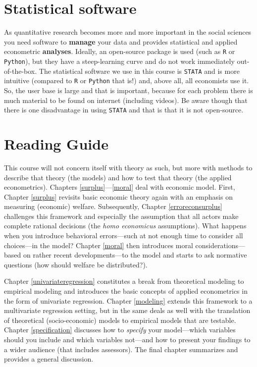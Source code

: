 \documentclass[
]{book}
\begin{document}
\hypertarget{statistical-software}{%
\section{Statistical software}\label{statistical-software}}

As quantitative research becomes more and more important in the social sciences you need software to \textbf{manage} your data and provides statistical and applied econometric \textbf{analyses}. Ideally, an open-source package is used (such as \texttt{R} or \texttt{Python}), but they have a steep-learning curve and do not work immediately out-of-the-box. The statistical software we use in this course is \texttt{STATA} and is more intuitive (compared to \texttt{R} or \texttt{Python} that is!) and, above all, all economists use it. So, the user base is large and that is important, because for each problem there is much material to be found on internet (including videos). Be aware though that there is one disadvantage in using \texttt{STATA} and that is that it is not open-source.

\hypertarget{reading-guide}{%
\section{Reading Guide}\label{reading-guide}}

This course will not concern itself with theory as such, but more with methods to describe that theory (the models) and how to test that theory (the applied econometrics). Chapters \ref{surplus}---\ref{moral} deal with economic model. First, Chapter \ref{surplus} revisits basic economic theory again with an emphasis on measuring (economic) welfare. Subsequently, Chapter \ref{erroreconsurplus} challenges this framework and especially the assumption that all actors make complete rational decisions (the \emph{homo economicus} assumptions). What happens when you introduce behavioral errors---such at not enough time to consider all choices---in the model? Chapter \ref{moral} then introduces moral considerations---based on rather recent developments---to the model and starts to ask normative questions (how should welfare be distributed?).

Chapter \ref{univariateregression} constitutes a break from theoretical modeling to empirical modeling and introduces the basic concepts of applied econometrics in the form of univariate regression. Chapter \ref{modeling} extends this framework to a multivariate regression setting, but in the same deals as well with the translation of theoretical (socio-economic) models to empirical models that are testable. Chapter \ref{specification} discusses how to \emph{specify} your model---which variables should you include and which variables not---and how to present your findings to a wider audience (that includes assessors). The final chapter summarizes and provides a general discussion.
\end{document}
